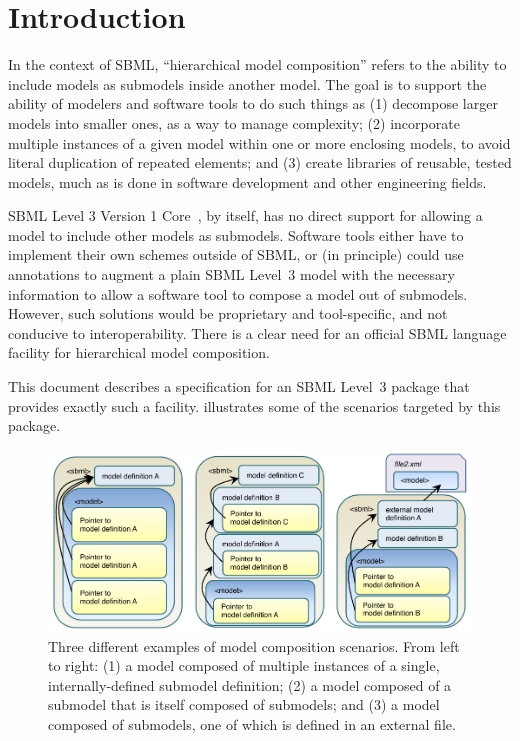 
\section{Introduction}
\label{intro}

In the context of SBML, ``hierarchical model composition'' refers to the ability to include models as submodels inside another model. The goal is to support the ability of modelers and software tools to do such things as (1) decompose larger models into smaller ones, as a way to manage complexity; (2) incorporate multiple instances of a given model within one or more enclosing models, to avoid literal duplication of repeated elements; and (3) create libraries of reusable, tested models, much as is done in software development and other engineering fields.

SBML Level 3 Version 1 Core~\citep{l3v1c}, by itself, has no direct support for allowing a model to include other models as submodels. Software tools either have to implement their own schemes outside of SBML, or (in principle) could use annotations to augment a plain SBML Level~3 model with the necessary information to allow a software tool to compose a model out of submodels.  However, such solutions would be proprietary and tool-specific, and not conducive to interoperability. There is a clear need for an official SBML language facility for hierarchical model composition.

This document describes a specification for an SBML Level~3 package that provides exactly such a facility.   illustrates some of the scenarios targeted by this package. 

\begin{figure}[hb]
  \includegraphics{figs/figure1}
  \caption{Three different examples of model composition scenarios.
    From left to right: (1) a model composed of multiple instances of a
    single, internally-defined submodel definition; (2) a model composed
    of a submodel that is itself composed of submodels; and (3) a model
    composed of submodels, one of which is defined in an external file.}
  \label{fig1}
\end{figure}

